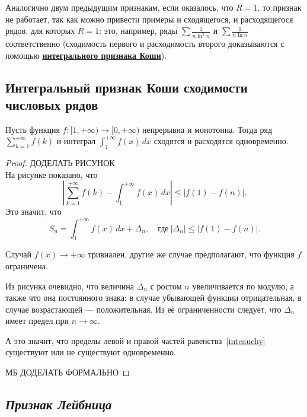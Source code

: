 \begin{remark}
	Аналогично двум предыдущим признакам, если оказалось, что \(R = 1\), то признак не работает, так как можно привести примеры и сходящегося, и расходящегося рядов, для которых \(R = 1\): это, например, ряды \(\sum \frac{1}{n \ln^2 n}\) и \(\sum \frac{1}{n \ln n}\) соответственно (сходимость первого и расходимость второго доказываются с помощью \hyperlink{интегральный признак Коши}{\bfseries интегрального признака Коши}).
\end{remark}

\subsection{Интегральный признак Коши сходимости числовых рядов}

\begin{theorem} \hypertarget{интегральный признак Коши}{}
	Пусть функция \(f \colon [1, +\infty) \to [0, +\infty)\) непрерывна и монотонна. Тогда ряд \(\displaystyle \sum_{k=1}^{+\infty} f(k)\) и интеграл \(\displaystyle \int_{1}^{+\infty} f(x) \, dx\) сходятся и расходятся одновременно.
\end{theorem}
\begin{proof}
	ДОДЕЛАТЬ РИСУНОК \\
	На рисунке показано, что \[
	\left|\sum_{k=1}^{+\infty} f(k) - \int_{1}^{+\infty} f(x) \, dx \right| \leqslant |f(1) - f(n)|.
	\]
	Это значит, что
	\begin{equation} \label{intcauchy}
		S_n = \displaystyle \int_{1}^{+\infty} f(x) \, dx + \Delta_n, \quad \text{где} \ |\Delta_n| \leqslant |f(1) - f(n)|.
	\end{equation}
	
	Случай \(f(x) \to +\infty\) тривиален, другие же случае предполагают, что функция \(f\) ограничена.
	
	Из рисунка очевидно, что величина \(\Delta_n\) с ростом \(n\) увеличивается по модулю, а также что она постоянного знака: в случае убывающей функции отрицательная, в случае возрастающей --- положительная. Из её ограниченности следует, что \(\Delta_n\) имеет предел при  \(n \to \infty\).
	
	А это значит, что пределы левой и правой частей равенства~\eqref{intcauchy} существуют или не существуют одновременно.
	
	МБ ДОДЕЛАТЬ ФОРМАЛЬНО
\end{proof}

\subsection{\itshape Признак Лейбница}

